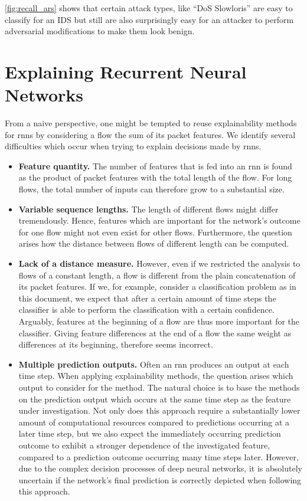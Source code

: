 \documentclass[conference]{IEEEtran}
\begin{document}
\autoref{fig:recall_ars} shows that certain attack types, like ``DoS Slowloris'' are easy to classify for an IDS but still are also surprisingly easy for an attacker to perform adversarial modifications to make them look benign.

\section{Explaining Recurrent Neural Networks}
From a naive perspective, one might be tempted to reuse explainability methods for \glspl{rnn} by considering a flow the sum of its packet features.
We identify several difficulties which occur when trying to explain decisions made by \glspl{rnn}.

\begin{itemize}[topsep=0pt,wide,labelwidth=!,labelindent=0pt]
\item
\textbf{Feature quantity.}
The number of features that is fed into an \gls{rnn} is found as the product of packet features with the total length of the flow. For long flows, the total number of inputs can therefore grow to a substantial size.

\item
\textbf{Variable sequence lengths.}
The length of different flows might differ tremendously. Hence, features which are important for the network's outcome for one flow might not even exist for other flows. Furthermore, the question arises how the distance between flows of different length can be computed.

\item
\textbf{Lack of a distance measure.}
However, even if we restricted the analysis to flows of a constant length, a flow is different from the plain concatenation of its packet features.
If we, for example, consider a classification problem as in this document, we expect that after a certain amount of time steps the classifier is able to perform the classification with a certain confidence. Arguably, features at the beginning of a flow are thus more important for the classifier. Giving feature differences at the end of a flow the same weight as differences at its beginning, therefore seems incorrect.

\item
\textbf{Multiple prediction outputs.}
Often an \gls{rnn} produces an output at each time step. When  applying explainability methods, the question arises which output to consider for the method. The natural choice is to base the methods on the prediction output which occurs at the same time step as the feature under investigation. Not only does this approach require a substantially lower amount of computational resources compared to predictions occurring at a later time step, but we also expect the immediately occurring prediction outcome to exhibit a stronger dependence of the investigated feature, compared to a prediction outcome occurring many time steps later.
However, due to the complex decision processes of deep neural networks,
it is absolutely  uncertain if the network's final prediction is correctly depicted when following this approach.
\end{itemize}
\end{document}
